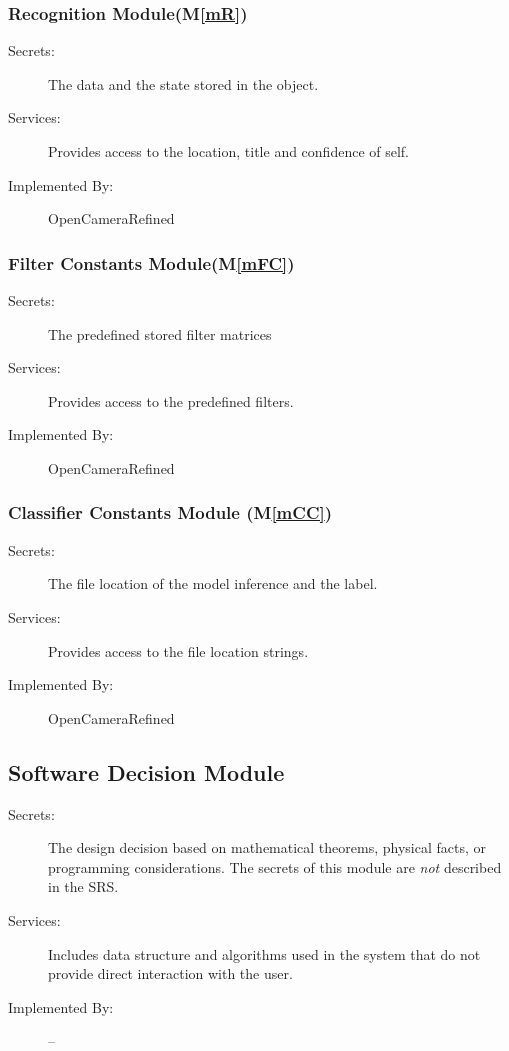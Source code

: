 \documentclass[12pt, titlepage]{article}
\newcommand{\mref}[1]{M\ref{#1}}
\begin{document}
\subsubsection{Recognition Module(\mref{mR})}

\begin{description}
\item[Secrets:]The data and the state stored in the object.
\item[Services:]Provides access to the location, title and confidence of self.
\item[Implemented By:] OpenCameraRefined
\end{description}

\subsubsection{Filter Constants Module(\mref{mFC})}

\begin{description}
\item[Secrets:]The predefined stored filter matrices 
\item[Services:]Provides access to the predefined filters.
\item[Implemented By:] OpenCameraRefined
\end{description}

\subsubsection{Classifier Constants Module (\mref{mCC})}

\begin{description}
\item[Secrets:]The file location of the model inference and the label.
\item[Services:]Provides access to the file location strings.
\item[Implemented By:] OpenCameraRefined
\end{description}


\subsection{Software Decision Module}

\begin{description}
\item[Secrets:] The design decision based on mathematical theorems, physical
  facts, or programming considerations. The secrets of this module are
  \emph{not} described in the SRS.
\item[Services:] Includes data structure and algorithms used in the system that
  do not provide direct interaction with the user. 
\item[Implemented By:] --
\end{description}
\end{document}
